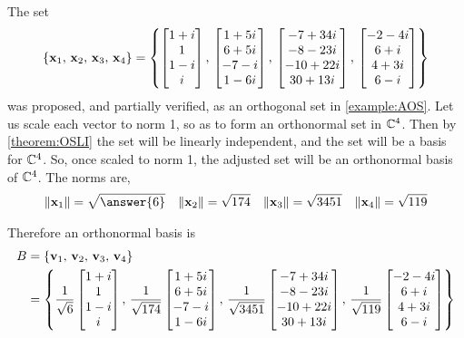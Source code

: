 \documentclass{ximera}
\begin{document}
\begin{example}
  The set
  \[
    \left\{\mathbf{x}_1,\,\mathbf{x}_2,\,\mathbf{x}_3,\,\mathbf{x}_4\right\}=
    \left\{
      \begin{bmatrix}1+i\\1\\1-i\\i\end{bmatrix},\,
      \begin{bmatrix}1+5i\\6+5i\\-7-i\\1-6i\end{bmatrix},\,
      \begin{bmatrix}-7+34i\\-8-23i\\-10+22i\\30+13i\end{bmatrix},\,
      \begin{bmatrix}-2-4i\\6+i\\4+3i\\6-i\end{bmatrix}
    \right\}
  \]
  was proposed, and partially verified, as an orthogonal set in
  \ref{example:AOS}.  Let us scale each vector to norm 1, so as to
  form an orthonormal set in $\mathbb{C}^{4}$.  Then by
  \ref{theorem:OSLI} the set will be linearly independent, and the set
  will be a basis for $\mathbb{C}^{4}$.  So, once scaled to norm 1, the
  adjusted set will be an orthonormal basis of $\mathbb{C}^{4}$.  The
  norms are,
  \begin{align*}
    \norm{\vect{x}_1}=\sqrt{\answer{6}}
    &&
       \norm{\vect{x}_2}=\sqrt{174}
    &&
       \norm{\vect{x}_3}=\sqrt{3451}
    &&
       \norm{\vect{x}_4}=\sqrt{119}
  \end{align*}

  \begin{feedback}[correct]
    Therefore an orthonormal basis is
    \begin{align*}
      B&=
         \left\{\mathbf{v}_1,\,\mathbf{v}_2,\,\mathbf{v}_3,\,\mathbf{v}_4\right\}\\
       &=\left\{
         \frac{1}{\sqrt{6}}\begin{bmatrix}1+i\\1\\1-i\\i\end{bmatrix},\,
      \frac{1}{\sqrt{174}}\begin{bmatrix}1+5i\\6+5i\\-7-i\\1-6i\end{bmatrix},\,
      \frac{1}{\sqrt{3451}}\begin{bmatrix}-7+34i\\-8-23i\\-10+22i\\30+13i\end{bmatrix},\,
      \frac{1}{\sqrt{119}}\begin{bmatrix}-2-4i\\6+i\\4+3i\\6-i\end{bmatrix}
      \right\}
    \end{align*}


\end{feedback}
\end{example}
\end{document}
